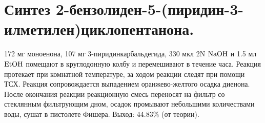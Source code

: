 \documentclass[a4paper]{article}
\begin{document}
\section*{Синтез 2-бензолиден-5-(пиридин-3-илметилен)циклопентанона.}
172 мг моноенона, 107 мг 3-пиридинкарбальдегида, 330 мкл 2N $\ce{NaOH}$ и 1.5 мл $\ce{EtOH}$ помещают в круглодонную колбу и перемешивают в течение часа. Реакция протекает при комнатной температуре, за ходом реакции следят при помощи ТСХ. Реакция сопровождается выпадением оранжево-желтого осадка диенона. После окончания реакции реакционную смесь переносят на фильтр со стеклянным фильтрующим дном, осадок промывают небольшими количествами воды, сушат в пистолете Фишера.
Выход: 44.83$\%$ (от теории).
\end{document}
